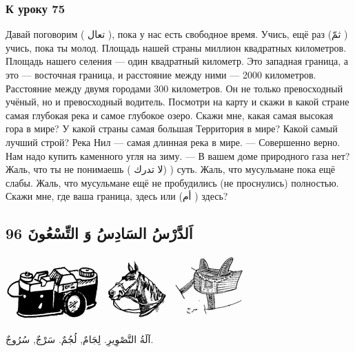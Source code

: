 \documentclass[a5paper]{article}
\begin{document}
\subsubsection[К уроку 75]{К уроку 75}
Давай поговорим ( تعال ), пока у нас есть свободное время. Учись, ещё раз (ثمّ ) учись, пока ты молод. Площадь нашей страны миллион квадратных километров. Площадь нашего селения — один квадратный километр. Это западная граница, а это — восточная граница, и расстояние между ними — 2000 километров. Расстояние между двумя городами 300 километров. Он не только превосходный учёный, но и превосходный водитель. Посмотри на карту и скажи в какой стране самая глубокая река и самое глубокое озеро. Скажи мне, какая самая высокая гора в мире? У какой страны самая большая Территория в мире? Какой самый лучший строй? Река Нил — самая длинная река в мире. — Совершенно верно. Нам надо купить каменного угля на зиму. — В вашем доме природного газа нет? Жаль, что ты не понимаешь ( لا تدرك) ) суть. Жаль, что мусульмане пока ещё слабы. Жаль, что мусульмане ещё не пробудились (не проснулись) полностью. Скажи мне, где ваша граница, здесь или (أم ) здесь?

\subsection{اَلدَّرْسُ السَادِسُ وَ التِّسْعُونَ 96}
 \includegraphics[width=1.4272in,height=0.8646in]{MuhammadBagauddinlatinized-img269.png}   \includegraphics[width=0.9791in,height=0.8957in]{MuhammadBagauddinlatinized-img270.png}   \includegraphics[width=1.1252in,height=0.9689in]{MuhammadBagauddinlatinized-img271.png} 

آلَةُ التَّصْوِيرِ. لِجَامٌ, لُجُمٌ. سَرْجٌ, سُرُوجٌ.
\end{document}
